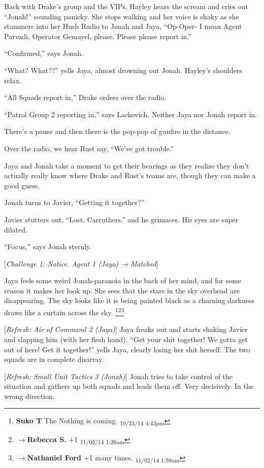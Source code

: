 Back with Drake's group and the VIPs, Hayley hears the scream and cries out ``Jonah!'' sounding panicky.   She stops walking and her voice is shaky as she stammers into her Hush Radio to Jonah and Jaya, ``Op-Oper- I mean Agent Parvadi, Operator Gemayel, please.  Please please report in.''

``Confirmed,'' says Jonah.

``What?  What??'' yells Jaya, almost drowning out Jonah.  Hayley's shoulders relax.

``All Squads report in,'' Drake orders over the radio.

``Patrol Group 2 reporting in,'' says Lackovich.  Neither Jaya nor Jonah report in.



There's a pause and then there is the pop-pop of gunfire in the distance.

Over the radio, we hear Rust say, ``We've got trouble.''

Jaya and Jonah take a moment to get their bearings as they realize they don't actually really know where Drake and Rust's teams are, though they can make a good guess.

Jonah turns to Javier, ``Getting it together?''

Javier stutters out, ``Lost.  Carruthers.'' and he grimaces.  His eyes are super dilated.

``Focus,'' says Jonah sternly.

{[}\textit{Challenge 1: Notice.  Agent 1 (Jaya) → Matched}{]}

Jaya feels some weird Jonah-paranoia in the back of her mind, and for some reason it makes her look up.  She sees that the stars in the sky overhead are disappearing.  The sky looks like it is being painted black as a churning darkness draws like a curtain across the sky. \footnote{\textbf{Suko T }The Nothing is coming. \textsubscript{10/23/14 4:43pm}}\footnote{$\rightarrow$\textbf{Rebecca S. }+1 \textsubscript{11/02/14 1:26am}}\footnote{$\rightarrow$\textbf{Nathaniel Ford }+1 many times. \textsubscript{11/02/14 1:59am}}

{[}\textit{Refresh: Air of Command 2 (Jaya)}{]}  Jaya freaks out and starts shaking Javier and slapping him (with her flesh hand).  ``Get your shit together!  We gotta get out of here!   Get it together!'' yells Jaya, clearly losing her shit herself. The two squads are in complete disarray.

{[}\textit{Refresh: Small Unit Tactics 3 (Jonah)}{]}  Jonah tries to take control of the situation and gathers up both squads and leads them off. Very decisively.  In the wrong direction.

